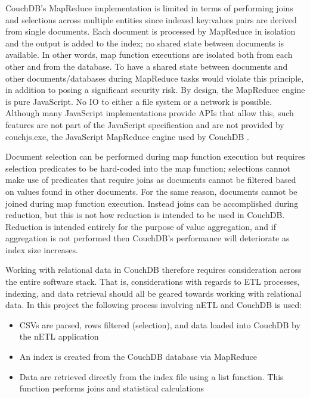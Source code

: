 \label{chapter-analysis}
CouchDB's MapReduce implementation is limited in terms of performing joins and selections across multiple entities since indexed key:values pairs are derived from single documents. Each document is processed by MapReduce in isolation and the output is added to the index; no shared state between documents is available. In other words, map function executions are isolated both from each other and from the database. To have a shared state between documents and other documents/databases during MapReduce tasks would violate this principle, in addition to posing a significant security risk. By design, the MapReduce engine is pure JavaScript. No IO to either a file system or a network is possible. Although many JavaScript implementations provide APIs that allow this, such features are not part of the JavaScript specification and are not provided by couchjs.exe, the JavaScript MapReduce engine used by CouchDB \cite{slack28Feb}.

Document selection can be performed during map function execution but requires selection predicates to be hard-coded into the map function; selections cannot make use of predicates that require joins as documents cannot be filtered based on values found in other documents. For the same reason, documents cannot be joined during map function execution. Instead joins can be accomplished during reduction, but this is not how reduction is intended to be used in CouchDB. Reduction is intended entirely for the purpose of value aggregation, and if aggregation is not performed then CouchDB’s performance will deteriorate as index size increases.

Working with relational data in CouchDB therefore requires consideration across the entire software stack. That is, considerations with regards to ETL processes, indexing, and data retrieval should all be geared towards working with relational data. In this project the following process involving nETL and CouchDB is used:

\begin{itemize}
  \item CSVs are parsed, rows filtered (selection), and data loaded into CouchDB by the nETL application
  \item An index is created from the CouchDB database via MapReduce
  \item Data are retrieved directly from the index file using a list function. This function performs joins and statistical calculations
\end{itemize}

